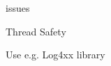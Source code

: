 
\begin{DoxyRefList}
\item[\label{todo__todo000001}%
\hypertarget{todo__todo000001}{}%
Class \hyperlink{class_logger}{Logger} ]issues
\begin{DoxyItemize}
\item Thread Safety
\end{DoxyItemize}
\end{DoxyRefList}

Use e.\+g. Log4xx library